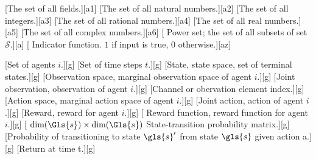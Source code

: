 

\newcommand*{\Agroupname}{General}
[The set of all fields.][a1]
[The set of all natural numbers.][a2]
[The set of all integers.][a3]
[The set of all rational numbers.][a4]
[The set of all real numbers.][a5]
[The set of all complex numbers.][a6]
[
    Power set; the set of all subsets of set \(\mathcal{S}\).][a]
[
    Indicator function. \(1\) if input is true, \(0\) otherwise.][az]


\newcommand*{\Ggroupname}{Games and Modeling}
[Set of agents \(i\).][g]
[Set of time steps \(t\).][g]
[State, state space, set of terminal states.][g]
[Observation space, marginal observation space of agent \(i\).][g]
[Joint observation, observation of agent \(i\).][g]
[Channel or obervation element index.][g]
[Action space, marginal action space of agent \(i\).][g]
[Joint action, action of agent \(i\).][g]
[Reward, reward for agent \(i\).][g]
[
    Reward function, reward function for agent \(i\).][g]
[
    \(\text{dim}(\Gls{s})\times\text{dim}(\Gls{s})\) 
    State-transition probability matrix.][g]
[Probability of transitioning to 
    state \(\gls{s}^\prime\) from state \(\gls{s}\) given action \gls{a}.][g]
[Return at time \gls{t}.][g]


